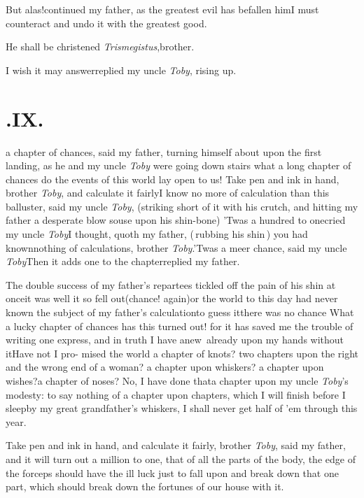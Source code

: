\documentclass{article}
\begin{document}
But alas!\@ continued my father, as the greatest evil has befallen him\tsh I must
counteract and undo it with the greatest good.

He shall be christened \textit{Trismegistus},\break brother.

I wish it may answer\tsh replied my uncle \textit{Toby}, rising up.

\smallskip
\section{.\enspace IX.}

 a chapter of chances, said my father, turning himself about upon the
first landing, as he and my\break 
uncle \textit{Toby} were going down stairs\tsh\break
what a long chapter of chances do the
events of this world lay open to us!\break
Take pen and ink in hand, brother \textit{Toby}, and
calculate it fairly\tsk I know no more of calculation than
this balluster, said my uncle \textit{Toby}, (striking short
of it with his crutch, and hitting my father a desperate
blow souse upon his shin-bone)\tsk\break
’Twas a hundred to one\tsk cried my uncle\break
\textit{Toby}\tsk\tsk I thought, quoth my
father, (\,rubbing his shin\,) you had known\break nothing of
calculations, brother \textit{Toby}.\break \tsk ’Twas a meer chance,
said my uncle \textit{Toby}\tsk Then it adds one to the
chapter\break\tsk replied my father.

The double success of my father’s re\-partees tickled off
the pain of his shin at once\tsk it was well it so fell out\tsk (chance!\@
again)\tsk or the world to this day had never
known the subject of my father’s calculation\tsk to guess
it\tsk there was no chance\tsk
What a lucky chapter of chances has this turned out! for it
has saved me the trouble of writing one express, and in
truth I have anew\sic\ already upon my hands without it\tsh Have
not I pro-\break 
mised the world a chapter of knots?\break
two chapters upon the right and the\break
wrong end of a woman? a chapter upon\break
whiskers? a chapter upon wishes?\tsk a chapter of noses?\tsk
No, I have done that\tsk a chapter upon my uncle
\textit{Toby}’s modesty: to say nothing of a chapter upon
chapters, which I will finish before I sleep\tsk by my great
grandfather’s whiskers, I shall never get half of ’em
through this year.

Take pen and ink in hand, and calculate it fairly, brother
\textit{Toby}, said my father, and it will turn out a
million to one, that of all the parts of the body, the edge
of the forceps should have the ill luck just to fall upon
and break down that one part, which should break down the
fortunes of our house with it.
\end{document}
